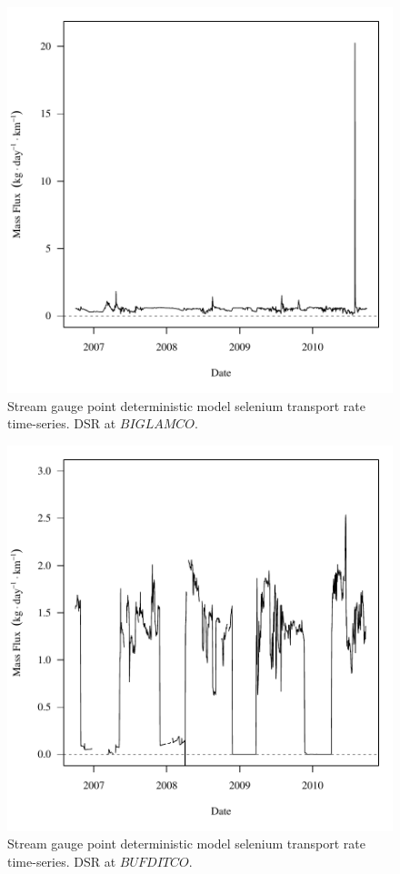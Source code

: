 \begin{figure}[htbp]
	\begin{center}
	\includegraphics[width=6in]{"Figures/Results_DDSR/f BIG"}
	\caption{Stream gauge point deterministic model selenium transport rate time-series.  DSR at $BIGLAMCO$.}
	\end{center}
\end{figure}
\newpage

\begin{figure}[htbp]
	\begin{center}
	\includegraphics[width=6in]{"Figures/Results_DDSR/f BUF"}
	\caption{Stream gauge point deterministic model selenium transport rate time-series.  DSR at $BUFDITCO$.}
	\end{center}
\end{figure}
\newpage

